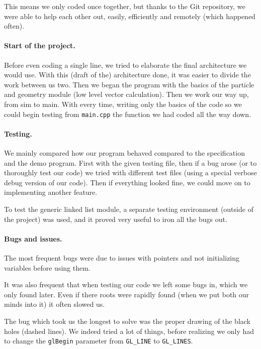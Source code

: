 \documentclass[a4paper]{article} %
\begin{document}
\begin{multicols*}{2}
This means we only coded once together, but thanks to the Git repository,
we were able to help each other out, easily, efficiently and remotely (which happened often).

\paragraph{Start of the project.} Before even coding a single line, we tried to elaborate the final
architecture we would use. With this (draft of the) architecture done, it was easier
to divide the work between us two.
Then we began the program with the basics of the particle and geometry module (low level vector calculation).
Then we work our way up, from sim to main. With every time, writing only the basics of the code so we could begin testing from \texttt{main.cpp}
the function we had coded all the way down.

\paragraph{Testing.}
We mainly compared how our program behaved compared to the specification and the demo program.
First with the given testing file, then if a bug arose (or to thoroughly test our code)
we tried with different test files (using a special verbose debug version of our code).
Then if everything looked fine, we could move on to implementing another feature.

To test the generic linked list module, a separate testing environment (outside of the project)
was used, and it proved very useful to iron all the bugs out.

\paragraph{Bugs and issues.}
The most frequent bugs were due to issues with pointers and not initializing variables before using them.

It was also frequent that when testing our code we left some bugs in, which we only found later.
Even if there roots were rapidly found (when we put both our minds into it) it often slowed us.

The bug which took us the longest to solve was the proper drawing of the black holes (dashed lines).
We indeed tried a lot of things, before realizing we only had to change the \texttt{glBegin} parameter from \texttt{GL\_LINE} to \texttt{GL\_LINES}.



\end{multicols*}
\end{document}
